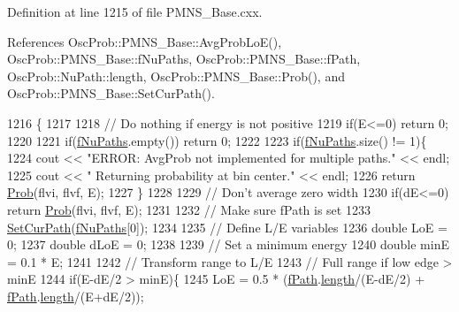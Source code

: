 Definition at line 1215 of file P\+M\+N\+S\+\_\+\+Base.\+cxx.



References Osc\+Prob\+::\+P\+M\+N\+S\+\_\+\+Base\+::\+Avg\+Prob\+Lo\+E(), Osc\+Prob\+::\+P\+M\+N\+S\+\_\+\+Base\+::f\+Nu\+Paths, Osc\+Prob\+::\+P\+M\+N\+S\+\_\+\+Base\+::f\+Path, Osc\+Prob\+::\+Nu\+Path\+::length, Osc\+Prob\+::\+P\+M\+N\+S\+\_\+\+Base\+::\+Prob(), and Osc\+Prob\+::\+P\+M\+N\+S\+\_\+\+Base\+::\+Set\+Cur\+Path().


\begin{DoxyCode}
1216 \{
1217 
1218   \textcolor{comment}{// Do nothing if energy is not positive}
1219   \textcolor{keywordflow}{if}(E<=0) \textcolor{keywordflow}{return} 0;
1220 
1221   \textcolor{keywordflow}{if}(\hyperlink{classOscProb_1_1PMNS__Base_a69db9d57e12fc7cbe0431bc6c18fac93}{fNuPaths}.empty()) \textcolor{keywordflow}{return} 0;
1222 
1223   \textcolor{keywordflow}{if}(\hyperlink{classOscProb_1_1PMNS__Base_a69db9d57e12fc7cbe0431bc6c18fac93}{fNuPaths}.size() != 1)\{
1224     cout << \textcolor{stringliteral}{"ERROR: AvgProb not implemented for multiple paths."} << endl;
1225     cout << \textcolor{stringliteral}{"       Returning probability at bin center."} << endl;
1226     \textcolor{keywordflow}{return} \hyperlink{classOscProb_1_1PMNS__Base_aec5c399b93261f1962a4b7dbbb44b973}{Prob}(flvi, flvf, E);
1227   \}
1228 
1229   \textcolor{comment}{// Don't average zero width}
1230   \textcolor{keywordflow}{if}(dE<=0) \textcolor{keywordflow}{return} \hyperlink{classOscProb_1_1PMNS__Base_aec5c399b93261f1962a4b7dbbb44b973}{Prob}(flvi, flvf, E);
1231 
1232   \textcolor{comment}{// Make sure fPath is set}
1233   \hyperlink{classOscProb_1_1PMNS__Base_a986e6ebef09a7e2eb7fee16a4c2c834d}{SetCurPath}(\hyperlink{classOscProb_1_1PMNS__Base_a69db9d57e12fc7cbe0431bc6c18fac93}{fNuPaths}[0]);
1234 
1235   \textcolor{comment}{// Define L/E variables}
1236   \textcolor{keywordtype}{double} LoE = 0;
1237   \textcolor{keywordtype}{double} dLoE = 0;
1238 
1239   \textcolor{comment}{// Set a minimum energy}
1240   \textcolor{keywordtype}{double} minE = 0.1 * E;
1241 
1242   \textcolor{comment}{// Transform range to L/E}
1243   \textcolor{comment}{// Full range if low edge > minE}
1244   \textcolor{keywordflow}{if}(E-dE/2 > minE)\{
1245     LoE = 0.5 * (\hyperlink{classOscProb_1_1PMNS__Base_a849437aa8891fe042e86886ce8f81c6e}{fPath}.\hyperlink{structOscProb_1_1NuPath_af22660894b6e25cf835500381b155557}{length}/(E-dE/2) + \hyperlink{classOscProb_1_1PMNS__Base_a849437aa8891fe042e86886ce8f81c6e}{fPath}.\hyperlink{structOscProb_1_1NuPath_af22660894b6e25cf835500381b155557}{length}/(E+dE/2));

\end{DoxyCode}
